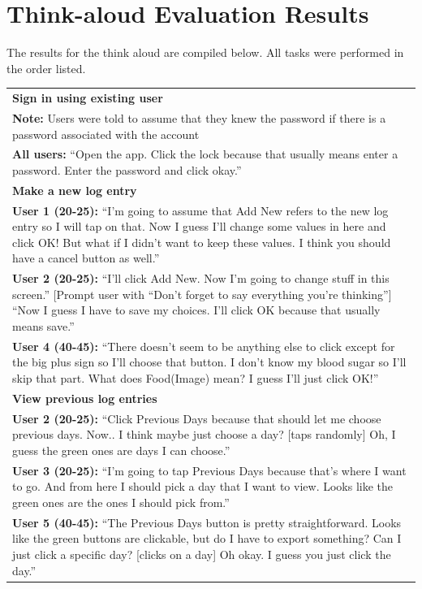 \documentclass[pdftex,12pt,a4paper]{report}
\begin{document}
\section*{Think-aloud Evaluation Results}
The results for the think aloud are compiled below. All tasks were performed in the order listed.
\begin{center}
	\begin{tabular}{|p{\textwidth}|}
	\hline
	\textbf{Sign in using existing user}\\
	\textbf{Note:} Users were told to assume that they knew the password if there is a password associated with the account\\
	\textbf{All users:} ``Open the app. Click the lock because that usually means enter a password. Enter the password and click okay.''\\
	\hline
	\textbf{Make a new log entry}\\
	\textbf{User 1 (20-25):} ``I'm going to assume that Add New refers to the new log entry so I will tap on that. Now I guess I'll change some values in here and click OK! But what if I didn't want to keep these values. I think you should have a cancel button as well.''\\
	\textbf{User 2 (20-25):} ``I'll click Add New. Now I'm going to change stuff in this screen.'' [Prompt user with ``Don't forget to say everything you're thinking''] ``Now I guess I have to save my choices. I'll click OK because that usually means save.''\\
	\textbf{User 4 (40-45):} ``There doesn't seem to be anything else to click except for the big plus sign so I'll choose that button. I don't know my blood sugar so I'll skip that part. What does Food(Image) mean? I guess I'll just click OK!''\\
	\hline
	\textbf{View previous log entries}\\
	\textbf{User 2 (20-25):} ``Click Previous Days because that should let me choose previous days. Now.. I think maybe just choose a day? [taps randomly]  Oh, I guess the green ones are days I can choose.''\\
	\textbf{User 3 (20-25):} ``I'm going to tap Previous Days because that's where I want to go. And from here I should pick a day that I want to view. Looks like the green ones are the ones I should pick from.''\\
	\textbf{User 5 (40-45):} ``The Previous Days button is pretty straightforward. Looks like the green buttons are clickable, but do I have to export something? Can I just click a specific day? [clicks on a day] Oh okay. I guess you just click the day.''\\

\end{tabular}
\end{center}
\end{document}
